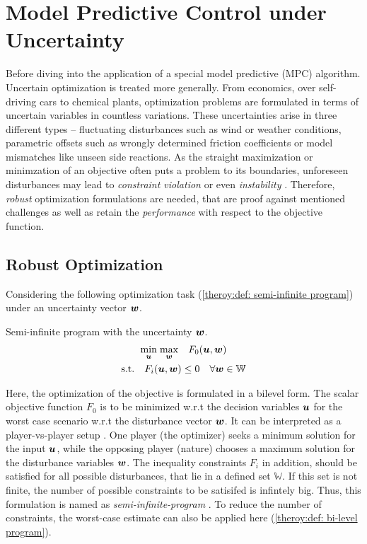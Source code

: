 \chapter{Model Predictive Control under Uncertainty}


Before diving into the application of a special model predictive (MPC) algorithm. Uncertain
optimization is treated more generally. From economics, over self-driving cars to chemical plants,
optimization problems are formulated in terms of uncertain variables in countless variations.
These uncertainties arise in three different types – fluctuating disturbances such as wind or weather conditions,
parametric offsets such as wrongly determined friction coefficients or model mismatches like unseen side reactions.
As the straight maximization or minimzation of an objective often puts a problem to its boundaries,
unforeseen disturbances may lead to \emph{constraint violation} or even \emph{instability} \cite{houska2011}.
Therefore, \emph{robust} optimization formulations are needed, that are proof against mentioned challenges as
well as retain the \emph{performance} with respect to the objective function.
\newline

\section{Robust Optimization}

Considering the following optimization task (\ref{theroy:def: semi-infinite program}) under an uncertainty vector ${\bm{w}}$.
\begin{definition} Semi-infinite program with the uncertainty ${\bm{w}}$.
    \label{theroy:def: semi-infinite program}
    \[
    \begin{gathered}
        \underset{{\bm{u}}}{\min} \; \underset{{\bm{w}}}{\max} \quad F_0({\bm{u}}, {\bm{w}}) \\
        \text{s.t.} \quad F_i({\bm{u}}, {\bm{w}}) \leq 0 \quad \forall {\bm{w}} \in \mathbb{W}
    \end{gathered}
    \]
\end{definition}

Here, the optimization of the objective is formulated in a bilevel form. The scalar objective function $F_0$ is to 
be minimized w.r.t the decision variables ${\bm{u}}$ for the worst case scenario w.r.t the disturbance
vector ${\bm{w}}$. It can be interpreted as a player-vs-player setup \cite{houska2011}. One player (the optimizer)
seeks a minimum solution for the input ${\bm{u}}$, while the opposing player (nature) chooses a maximum solution for the
disturbance variables ${\bm{w}}$. The inequality constraints $F_i$ in addition, should be satisfied for all possible disturbances, that
lie in a defined set $\mathbb{W}$. If this set is not finite, the number of possible 
constraints to be satisifed is infintely big. Thus, this formulation is named as \emph{semi-infinite-program} \cite{stein2003}.
To reduce the number of constraints, the worst-case estimate can also be applied here (\ref{theroy:def: bi-level program}). 

